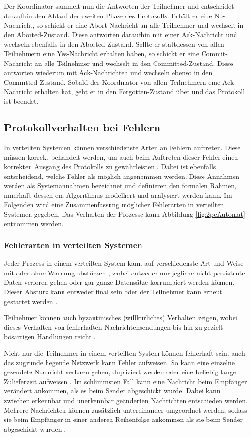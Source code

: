 \documentclass[12pt,a4paper]{tucarticle2019}
\begin{document}
	Der Koordinator sammelt nun die Antworten der Teilnehmer und entscheidet daraufhin den Ablauf der zweiten Phase des Protokolls. Erhält er eine No-Nachricht, so schickt er eine Abort-Nachricht an alle Teilnehmer und wechselt in den Aborted-Zustand. Diese antworten daraufhin mit einer Ack-Nachricht und wechseln ebenfalls in den Aborted-Zustand. Sollte er stattdessen von allen Teilnehmern eine Yes-Nachricht erhalten haben, so schickt er eine Commit-Nachricht an alle Teilnehmer und wechselt in den Committed-Zustand. Diese antworten wiederum mit Ack-Nachrichten und wechseln ebenso in den Committed-Zustand.
	Sobald der Koordinator von allen Teilnehmern eine Ack-Nachricht erhalten hat, geht er in den Forgotten-Zustand über und das Protokoll ist beendet.
	
	\subsection{Protokollverhalten bei Fehlern}
	In verteilten Systemen können verschiedenste Arten an Fehlern auftreten. Diese müssen korrekt behandelt werden, um auch beim Auftreten dieser Fehler einen korrekten Ausgang des Protokolls zu gewährleisten \cite{kleppmannblog}. Dabei ist ebenfalls entscheidend, welche Fehler als möglich angenommen werden. Diese Annahmen werden als Systemannahmen bezeichnet und definieren den formalen Rahmen, innerhalb dessen ein Algorithmus modelliert und analysiert werden kann. Im Folgenden wird eine Zusammenfassung möglicher Fehlerarten in verteilten Systemen gegeben. Das Verhalten der Prozesse kann Abbildung \ref{fig:2pcAutomat} entnommen werden.
	\subsubsection{Fehlerarten in verteilten Systemen}
	Jeder Prozess in einem verteilten System kann auf verschiedenste Art und Weise mit oder ohne Warnung abstürzen \cite{lynchbook}, wobei entweder nur jegliche nicht persistente Daten verloren gehen oder gar ganze Datensätze korrumpiert werden können. Dieser Absturz kann entweder final sein oder der Teilnehmer kann erneut gestartet werden \cite{kleppmannbook}.
	
	Teilnehmer können auch byzantinisches (willkürliches) Verhalten zeigen, wobei dieses Verhalten von fehlerhaften Nachrichtensendungen bis hin zu gezielt bösartigen Handlungen reicht \cite{kleppmannbook}.
	
	Nicht nur die Teilnehmer in einem verteilten System können fehlerhaft sein, auch das zugrunde liegende Netzwerk kann Fehler aufweisen. So kann eine einzelne gesendete Nachricht verloren gehen, dupliziert werden oder eine beliebig lange Zulieferzeit aufweisen \cite{kleppmannbook}. Im schlimmsten Fall kann eine Nachricht beim Empfänger verändert ankommen, als es beim Sender abgeschickt wurde. Dabei kann zwischen erkennbar und unerkennbar geänderten Nachrichten entschieden werden. Mehrere Nachrichten können zusätzlich untereinander umgeordnet werden, sodass sie beim Empfänger in einer anderen Reihenfolge ankommen als sie beim Sender abgeschickt wurden \cite{kleppmannblog}.
\end{document}
